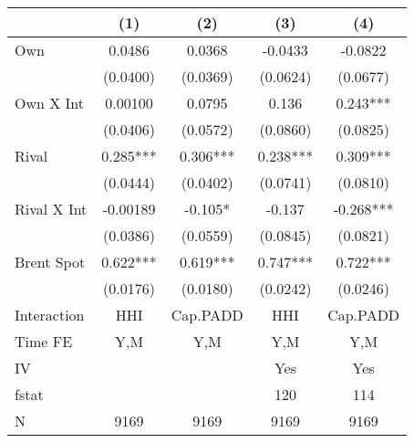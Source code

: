 {
\def\sym#1{\ifmmode^{#1}\else\(^{#1}\)\fi}
\begin{tabular}{l*{4}{c}}
\toprule
                &\multicolumn{1}{c}{(1)}   &\multicolumn{1}{c}{(2)}   &\multicolumn{1}{c}{(3)}   &\multicolumn{1}{c}{(4)}   \\
\midrule
Own             &   0.0486   &   0.0368   &  -0.0433   &  -0.0822   \\
                & (0.0400)   & (0.0369)   & (0.0624)   & (0.0677)   \\
\addlinespace
Own X Int       &  0.00100   &   0.0795   &    0.136   &    0.243***\\
                & (0.0406)   & (0.0572)   & (0.0860)   & (0.0825)   \\
\addlinespace
Rival           &    0.285***&    0.306***&    0.238***&    0.309***\\
                & (0.0444)   & (0.0402)   & (0.0741)   & (0.0810)   \\
\addlinespace
Rival X Int     & -0.00189   &   -0.105*  &   -0.137   &   -0.268***\\
                & (0.0386)   & (0.0559)   & (0.0845)   & (0.0821)   \\
\addlinespace
Brent Spot      &    0.622***&    0.619***&    0.747***&    0.722***\\
                & (0.0176)   & (0.0180)   & (0.0242)   & (0.0246)   \\
\midrule
Interaction     &      HHI   & Cap.PADD   &      HHI   & Cap.PADD   \\
Time FE         &      Y,M   &      Y,M   &      Y,M   &      Y,M   \\
IV              &            &            &      Yes   &      Yes   \\
fstat           &            &            &      120   &      114   \\
N               &     9169   &     9169   &     9169   &     9169   \\
\bottomrule
\end{tabular}
}
